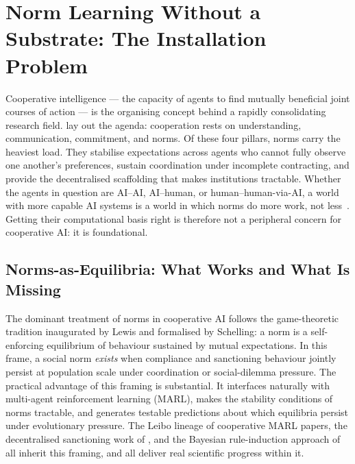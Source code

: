 \section{Norm Learning Without a Substrate: The Installation Problem}\label{sec:cooperative-ai}


Cooperative intelligence --- the capacity of agents to find mutually
beneficial joint courses of action --- is the organising concept behind a
rapidly consolidating research field. \citet{dafoe2020CooperativeAI} lay out
the agenda: cooperation rests on understanding, communication, commitment, and
norms. Of these four pillars, norms carry the heaviest load. They stabilise
expectations across agents who cannot fully observe one another's preferences,
sustain coordination under incomplete contracting, and provide the decentralised
scaffolding that makes institutions tractable. Whether the agents in question are
AI--AI, AI--human, or human--human-via-AI, a world with more capable AI systems
is a world in which norms do more work, not less~\citep{critchKrueger2020ARCHES}.
Getting their computational basis right is therefore not a peripheral concern for
cooperative AI: it is foundational.

\subsection*{Norms-as-Equilibria: What Works and What Is Missing}

The dominant treatment of norms in cooperative AI follows the game-theoretic
tradition inaugurated by Lewis and formalised by Schelling: a norm is a
self-enforcing equilibrium of behaviour sustained by mutual expectations. In this
frame, a social norm \textit{exists} when compliance and sanctioning behaviour
jointly persist at population scale under coordination or social-dilemma
pressure. The practical advantage of this framing is substantial. It interfaces
naturally with multi-agent reinforcement learning (MARL), makes the stability
conditions of norms tractable, and generates testable predictions about which
equilibria persist under evolutionary pressure. The Leibo lineage of cooperative
MARL papers, the decentralised sanctioning work of \citet{vinitsky2023sanctions},
and the Bayesian rule-induction approach of \citet{oldenburgZhiXuan2024BayesianRule}
all inherit this framing, and all deliver real scientific progress within it.

